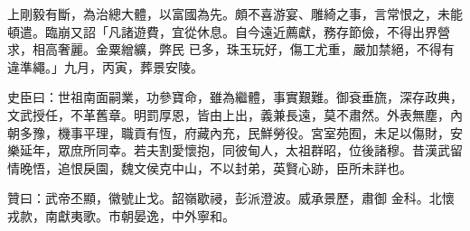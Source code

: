 \begin{pinyinscope}
 上剛毅有斷，為治總大體，以富國為先。頗不喜游宴、雕綺之事，言常恨之，未能頓遣。臨崩又詔「凡諸遊費，宜從休息。自今遠近薦獻，務存節儉，不得出界營求，相高奢麗。金粟繒纊，弊民
 已多，珠玉玩好，傷工尤重，嚴加禁絕，不得有違準繩。」九月，丙寅，葬景安陵。



 史臣曰：世祖南面嗣業，功參寶命，雖為繼體，事實艱難。御袞垂旒，深存政典，文武授任，不革舊章。明罰厚恩，皆由上出，義兼長遠，莫不肅然。外表無塵，內朝多豫，機事平理，職貢有恆，府藏內充，民鮮勞役。宮室苑囿，未足以傷財，安樂延年，眾庶所同幸。若夫割愛懷抱，同彼甸人，太祖群昭，位後諸穆。昔漢武留情晚悟，追恨戾園，魏文侯克中山，不以封弟，英賢心跡，臣所未詳也。



 贊曰：武帝丕顯，徽號止戈。韶嶺歇祲，彭派澄波。威承景歷，肅御
 金科。北懷戎款，南獻夷歌。市朝晏逸，中外寧和。



\end{pinyinscope}